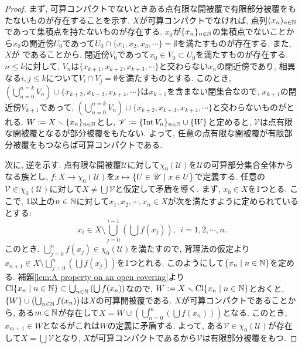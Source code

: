 \documentclass[uplatex, dvipdfmx, a4paper, 12pt, class=jsbook, crop=false]{standalone}
\begin{document}
\begin{proof}
	まず, 可算コンパクトでないときある点有限な開被覆で有限部分被覆をもたないものが存在することを示す. $ X $が可算コンパクトでなければ, 点列$ (x_n)_{n \in \mathbb{N}} $であって集積点を持たないものが存在する. $ x_0 $が$ \{x_n\}_{n \in \mathbb{N}} $の集積点でないことから$ x_0 $の開近傍$ U_0 $であって$ U_0 \cap \{x_1, x_2, x_3, \cdots\} = \emptyset $を満たすものが存在する. また, $ X $が  であることから, 閉近傍$ V_0 $であって$ x_0 \in V_0 \subset U_0 $を満たすものが存在する. $ n \leq k $に対して, $ V_n $は$ \{x_{k+1}, x_{k+2}, x_{k+3}, \cdots\}$と交わらない$ x_n $の閉近傍であり, 相異なる$ i, j \leq k $について$ V_i \cap V_j = \emptyset $を満たすものとする. このとき, $ \left(\bigcup_{n=0}^{n=k} V_{n} \right) \cup \{x_{k+2}, x_{k+3}, x_{k+4}, \cdots\} $は$ x_{k+1} $を含まない閉集合なので, $ x_{k+1} $の閉近傍$ V_{k+1} $であって, $ \left(\bigcup_{n=0}^{n=k} V_{n} \right) \cup \{x_{k+2}, x_{k+3}, x_{k+4}, \cdots\} $と交わらないものがとれる. $ W \mathrel{:=} X \smallsetminus \{x_n\}_{n \in \mathbb{N}} $とし, $ \mathscr{V} \mathrel{:=} \{\mathop{\mathrm{Int}}\nolimits V_n\}_{n \in \mathbb{N}} \cup \{W\} $と定めると, $ \mathscr{V} $は点有限な開被覆となるが部分被覆をもたない. よって, 任意の点有限な開被覆が有限部分被覆をもつならば可算コンパクトである.
	
	次に, 逆を示す. 点有限な開被覆$ \mathscr{U} $に対して$ \chi_0(\mathscr{U}) $を$ \mathscr{U} $の可算部分集合全体からなる族とし, $ f \colon X \to \chi_0(\mathscr{U}) $を$ x \mapsto \setcomp{U \in \mathscr{U}}{x \in U} $で定義する. 任意の$ \mathscr{V} \in \chi_0(\mathscr{U}) $に対して$ X \neq \bigcup \mathscr{V} $と仮定して矛盾を導く. まず, $ x_0 \in X $を1つとる. ここで, 1以上の$ n \in \mathbb{N} $に対して$ x_1, x_2, \cdots, x_n \in X $が次を満たすように定められているとする:
	$$ x_i \in X \setminus \bigcup_{j=0}^{i-1} \left(\bigcup f(x_j)\right), \ \ i = 1, 2, \cdots, n. $$
	このとき, $ \bigcup_{j=0}^{n} f(x_j) \in \chi_0(\mathscr{U}) $を満たすので, 背理法の仮定より$ x_{n+1} \in X \setminus \bigcup_{j=0}^{n} \left(\bigcup f(x_j)\right) $を1つとれる. このようにして$ \setcomp{x_n}{n \in \N} $を定める. 補題\ref{lem:A property on an open covering}より$ \topcl \setcomp{x_n}{n \in \N} \subset \bigcup_{n \in \N} \left(\bigcup f(x_n)\right) $なので, $ W \defeq X \setminus \topcl \setcomp{x_n}{n \in \N} $とおくと, $ \{W\} \cup \left(\bigcup_{n \in \mathbb{N}} f(x_n) \right) $は$ X $の可算開被覆である. $ X $が可算コンパクトであることから, ある$ m \in \mathbb{N} $が存在して$ X = W \cup \left(\bigcup_{n=0}^m \left(\bigcup f(x_n) \right)\right) $となる. このとき, $ x_{m+1} \in W $となるがこれは$ W $の定義に矛盾する. よって, ある$ \mathscr{V} \in \chi_0(\mathscr{U}) $が存在して$ X = \bigcup \mathscr{V} $となり, $ X $が可算コンパクトであるから$ \mathscr{V} $は有限部分被覆をもつ.
\end{proof}
\end{document}
